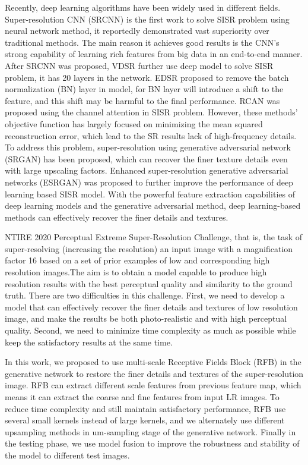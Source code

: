 \documentclass[10pt,twocolumn,letterpaper]{article}
\begin{document}
Recently, deep learning algorithms have been widely used in different fields.  Super-resolution CNN (SRCNN) \cite{dong2014learning} is the first work to solve SISR problem using neural network method, it reportedly demonstrated vast superiority over traditional methods. The main reason it achieves good results is the CNN's strong capability of learning rich features from big data in an end-to-end manner. After SRCNN was proposed, VDSR \cite{kim2016accurate} further use deep model to solve SISR problem, it has 20 layers in the network. EDSR \cite{lim2017enhanced} proposed to remove the batch normalization (BN) layer in model, for BN layer will introduce a shift to the feature, and this shift may be harmful to the final performance. RCAN \cite{zhang2018image} was proposed using the channel attention in SISR problem. However, these methods' objective function has largely focused on minimizing the mean squared reconstruction error, which lead to the SR results lack of high-frequency details. To address this problem, super-resolution using generative adversarial network (SRGAN) \cite{ledig2017photo} has been proposed, which can recover the finer texture details even with large upscaling factors. Enhanced super-resolution generative adversarial networks (ESRGAN) \cite{wang2018esrgan} was proposed to further improve the performance of deep learning based SISR model. With the powerful feature extraction capabilities of deep learning models and the generative adversarial method, deep learning-based methods can effectively recover the finer details and textures.

NTIRE 2020 Perceptual Extreme Super-Resolution Challenge, that is, the task of super-resolving (increasing the resolution) an input image with a magnification factor 16 based on a set of prior examples of low and corresponding high resolution images.The aim is to obtain a model capable to produce high resolution results with the best perceptual quality and similarity to the ground truth. There are two difficulties in this challenge. First, we need to develop a model that can effectively recover the finer details and textures of low resolution image, and make the results be both photo-realistic and with high perceptual quality. Second, we need to minimize time complexity as much as possible while keep the satisfactory results at the same time.

In this work, we proposed to use multi-scale Receptive Fields Block (RFB) in the generative network to restore the finer details and textures of the super-resolution image. RFB can extract different scale features from previous feature map, which means it can extract the coarse and fine features from input LR images. To reduce time complexity and still maintain satisfactory performance, RFB use several small kernels instead of large kernels, and we alternately use different upsampling methods in um-sampling stage of the generative network. Finally in the testing phase, we use model fusion to improve the robustness and stability of the model to different test images.
\end{document}
